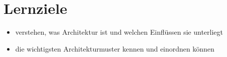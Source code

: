 \section{Lernziele}
\begin{itemize}
    \item verstehen, was Architektur ist und welchen Einflüssen sie unterliegt
    \item die wichtigsten Architekturmuster kennen und einordnen können
\end{itemize}